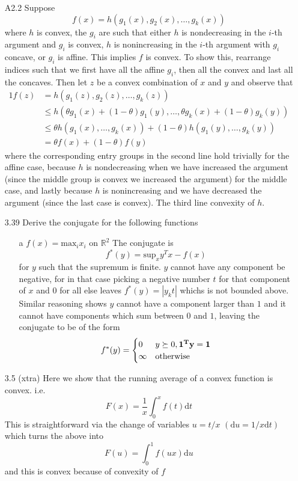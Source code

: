 \documentclass[12pt]{article}
\begin{document}
\begin{itemize}
\begin{itemize}
  \end{itemize}
\item[A2.2] Suppose
  $$f(x) = h(g_1(x), g_2(x), \ldots, g_k(x))$$
  where $h$ is convex, the $g_i$ are such that either $h$ is nondecreasing in the $i$-th argument and $g_i$ is convex, $h$ is nonincreasing in the $i$-th argument with $g_i$ concave, or $g_i$ is affine. This implies $f$ is convex. To show this, rearrange indices such that we first have all the affine $g_i$, then all the convex and last all the concaves.
  Then let $z$ be a convex combination of $x$ and $y$ and observe that
  \begin{alignat*}{1}
    f(z) & = h(g_1(z),g_2(z), \ldots, g_k(z)) \\
    & \leq h(\theta g_1(x) + (1-\theta) g_1(y), \ldots, \theta g_k(x) + (1 - \theta) g_k(y)) \\
    & \leq \theta h(g_1(x), \ldots, g_k(x)) + (1-\theta) h(g_1(y), \ldots, g_k(y)) \\
    & = \theta f(x) + (1-\theta) f(y)
  \end{alignat*}
  where the corresponding entry groups in the second line hold trivially for the affine case, because $h$ is nondecreasing when we have increased the argument (since the middle group is convex we increased the argument) for the middle case, and lastly because $h$ is nonincreasing and we have decreased the argument (since the last case is convex). The third line convexity of $h$.
\item[3.39] Derive the conjugate for the following functions
  \begin{itemize}
  \item[a] $f(x) = \text{max}_i x_i$ on $\mathbb{R}^2$
    The conjugate is
    $$
    f^*(y) = \text{sup}_{x} y^T x - f(x)
    $$
    for $y$ such that the supremum is finite. $y$ cannot have any component be negative, for in that case picking a negative number $t$ for that component of $x$ and $0$ for all else leaves $f^*(y) = |y_kt|$ whichs is not bounded above. Similar reasoning shows $y$ cannot have a component larger than $1$ and it cannot have components which sum between $0$ and $1$, leaving the conjugate to be of the form
    $$
    f^*(y) = \begin{cases}
      0 & y \succeq 0, \bf{1}^T y = 1 \\
      \infty & \text{otherwise}
      \end{cases}
    $$
  \end{itemize}

\item[3.5 (xtra)]  Here we show that the running average of a convex function is convex. i.e.
  $$F(x) = \frac{1}{x} \int_0^x f(t) \mathrm{d}t$$
  This is straightforward via the change of variables $u = t/x$ $(\mathrm{d}u = 1/x \mathrm{d}t)$ which turns the above into
  $$
  F(u) = \int_0^1 f(ux) \mathrm{d}u
  $$
  and this is convex because of convexity of $f$


\end{itemize}
\end{document}
